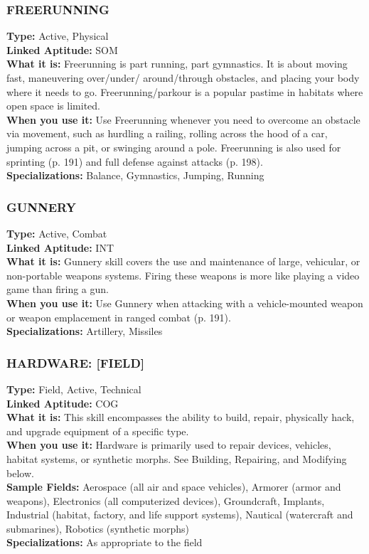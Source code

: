 \subsubsection{FREERUNNING} \textbf{Type:} Active, Physical \\ \textbf{Linked Aptitude:} SOM \\ \textbf{What it is:} Freerunning is part running, part gymnastics. It is about moving fast, maneuvering over/under/ around/through obstacles, and placing your body where it needs to go. Freerunning/parkour is a popular pastime in habitats where open space is limited. \\ \textbf{When you use it:} Use Freerunning whenever you need to overcome an obstacle via movement, such as hurdling a railing, rolling across the hood of a car, jumping across a pit, or swinging around a pole. Freerunning is also used for sprinting (p. 191) and full defense against attacks (p. 198). \\ \textbf{Specializations:} Balance, Gymnastics, Jumping, Running 

\subsubsection{GUNNERY} \textbf{Type:} Active, Combat \\ \textbf{Linked Aptitude:} INT \\ \textbf{What it is:} Gunnery skill covers the use and maintenance of large, vehicular, or non-portable weapons systems. Firing these weapons is more like playing a video game than firing a gun. \\ \textbf{When you use it:} Use Gunnery when attacking with a vehicle-mounted weapon or weapon emplacement in ranged combat (p. 191). \\ \textbf{Specializations:} Artillery, Missiles 

\subsubsection{HARDWARE: [FIELD]} \textbf{Type:} Field, Active, Technical \\ \textbf{Linked Aptitude:} COG \\ \textbf{What it is:} This skill encompasses the ability to build, repair, physically hack, and upgrade equipment of a specific type. \\ \textbf{When you use it:} Hardware is primarily used to repair devices, vehicles, habitat systems, or synthetic morphs. See Building, Repairing, and Modifying below. \\ \textbf{Sample Fields:} Aerospace (all air and space vehicles), Armorer (armor and weapons), Electronics (all computerized devices), Groundcraft, Implants, Industrial (habitat, factory, and life support systems), Nautical (watercraft and submarines), Robotics (synthetic morphs) \\ \textbf{Specializations:} As appropriate to the field 



